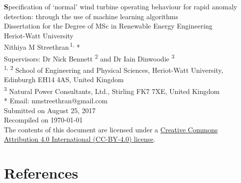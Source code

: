 \documentclass[twoside,11pt,openany]{book}
\title{\textbf\documenttitle}
\author{\authorname}
\def\documenttitle{Specification of \texorpdfstring{`}{'}normal' wind turbine
  operating behaviour for rapid anomaly detection: through the use of machine
  learning algorithms}
\def\authorname{Nithiya M Streethran}
\def\documentdate{August 25, 2017}
\def\programme{MSc in Renewable Energy Engineering}
\begin{document}
  \frontmatter
  \begin{titlepage}
    \hspace{0pt} %
    \vfill %
    \centering %
    \huge\textbf\documenttitle
    \\[2cm]
    \Large Dissertation for the Degree of \programme
    \\
    Heriot-Watt University
    \\[2cm]
    \authorname \textsuperscript{\,1, }*
    \\[.3cm]
    Supervisors: Dr Nick Bennett \textsuperscript{2} and
    Dr Iain Dinwoodie \textsuperscript{3}
    \\[.3cm]
    \large
    \textsuperscript{1, 2} School of Engineering and Physical Sciences,
    Heriot-Watt University, Edinburgh EH14 4AS, United Kingdom
    \\[.1cm]
    \textsuperscript{3} Natural Power Consultants, Ltd.,
    Stirling FK7 7XE, United Kingdom
    \\[.3cm]
    * Email: nmstreethran@gmail.com
    \\[2cm]
    \Large
    Submitted on \documentdate
    \\[.3cm]
    Recompiled on \today
    \\[2cm]
    The contents of this document are licensed under a
    \href{https://creativecommons.org/licenses/by/4.0/}
    {Creative Commons Attribution 4.0 International (CC-BY-4.0) license}.
    \vfill %
    \hspace{0pt} %
  \end{titlepage}
  
  \tableofcontents
  \listoffigures
  \listoftables

  \mainmatter
  
  
  
  
  

  {
    \backmatter
    

    \chapter{References}
    \begingroup
    \relax
    \printbibliography[heading=none]
    \endgroup
  }

  \appendix
  
\end{document}

